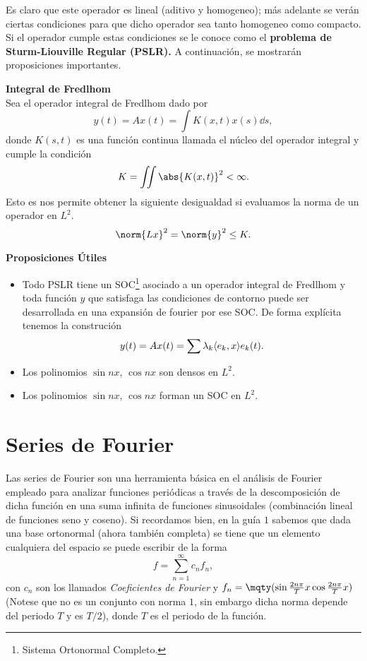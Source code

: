 Es claro que este operador es lineal (aditivo y homogeneo); más adelante se verán ciertas condiciones para que dicho operador sea tanto homogeneo como compacto. Si el operador cumple estas condiciones se le conoce como el \textbf{problema de Sturm-Liouville Regular (PSLR).} A continuación, se mostrarán proposiciones importantes.




\begin{mdframed}[style=warning]
	{\large \textbf{Integral de Fredlhom}} \\
	Sea el operador integral de Fredlhom dado por
		$$ y(t) = Ax(t) = \int K(x,t) x(s) \dd{s}, $$
	donde $K(s,t)$ es una función continua llamada el núcleo del operador integral y cumple la condición
		$$ K = \iint \abs{K(x,t)}^2 < \infty . $$
	Esto es nos permite obtener la siguiente desigualdad si evaluamos la norma de un operador en $L^2$.
		$$ \norm{Lx}^2 = \norm{y}^2 \leq K. $$
\end{mdframed}




\begin{mdframed}[style=warning]
	{\large \textbf{Proposiciones Útiles}}
	\begin{itemize}
		\item Todo PSLR tiene un SOC\footnote{Sistema Ortonormal Completo.} asociado a un operador integral de Fredlhom y toda función $y$ que satisfaga las condiciones de contorno puede ser desarrollada en una expansión de fourier por ese SOC. De forma explícita tenemos la construción
			$$ y(t) = Ax(t) = \sum \lambda _k \langle e_k , x \rangle e_k (t) . $$
		\item Los polinomios $\sin{nx}$, $\cos{nx}$ son densos en $L^2$.
		\item Los polinomios $\sin{nx}$, $\cos{nx}$ forman un SOC en $L^2$.
	\end{itemize}
\end{mdframed}

\section*{Series de Fourier}

Las series de Fourier son una herramienta básica en el análisis de Fourier empleado para analizar funciones periódicas a través de la descomposición de dicha función en una suma infinita de funciones sinusoidales (combinación lineal de funciones seno y coseno). Si recordamos bien, en la guía $1$ sabemos que dada una base ortonormal (ahora también completa) se tiene que un elemento cualquiera del espacio se puede escribir de la forma
	$$ f = \sum _{n = 1} ^\infty c_n f_n, $$
con $c_n$ son los llamados \textit{Coeficientes de Fourier} y $f_n = \mqty(\sin{\frac{2n\pi}{T} x} \\ \cos{\frac{2n\pi}{T} x})$ (Notese que no es un conjunto con norma $1$, sin embargo dicha norma depende del periodo $T$ y es $T/2$), donde $T$ es el periodo de la función. 


